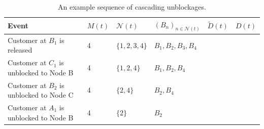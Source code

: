 \documentclass{article}
\begin{document}
\begin{table}
\begin{center}
\begin{tabular}{m{} m{} m{} m{} m{} m{}}
\toprule
\vspace{0.5mm}\large{Event}\vspace{0.5mm} & \vspace{0.5mm}\large{$M(t)$}\vspace{0.5mm} & \vspace{0.5mm}\large{$\mathcal{N}(t)$}\vspace{0.5mm} & \vspace{0.5mm}\large{$(B_n)_{n\in\mathcal{N}(t)}$}\vspace{0.5mm} & \vspace{0.5mm}\large{$\tilde{D}(t)$}\vspace{0.5mm} & \vspace{0.5mm}\large{$D(t)$}\vspace{0.5mm} \\
\midrule
Customer at $B_1$ is released            & 4 & $\{1, 2, 3, 4\}$ & $B_1, B_2, B_3, B_4$ & \vspace{1mm} & \vspace{1mm} \\ \midrule
Customer at $C_1$ is unblocked to Node B & 4 & $\{1, 2, 4\}$    & $B_1, B_2, B_4$      & \vspace{1mm} & \vspace{1mm} \\ \midrule
Customer at $B_2$ is unblocked to Node C & 4 & $\{2, 4\}$       & $B_2, B_4$           & \vspace{1mm} & \vspace{1mm} \\ \midrule
Customer at $A_1$ is unblocked to Node B & 4 & $\{2\}$          & $B_2$                & \vspace{1mm} & \vspace{1mm} \\
\bottomrule
\end{tabular}
\caption{An example sequence of cascading unblockages.}
\label{tbl:unblockage_sequence}
\end{center}
\end{table}
\end{document}
